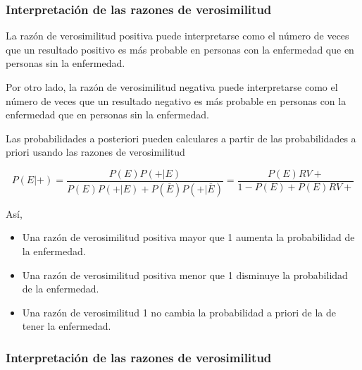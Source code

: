 	
\begin{frame}
\frametitle{Interpretación de las razones de verosimilitud}
La razón de verosimilitud positiva puede interpretarse como el número de veces que un resultado positivo es más probable en personas con la enfermedad que en personas sin la enfermedad.
	
Por otro lado, la razón de verosimilitud negativa puede interpretarse como el número de veces que un resultado negativo es más probable en personas con la enfermedad que en personas sin la enfermedad.
	
Las probabilidades a posteriori pueden calculares a partir de las probabilidades a priori usando las razones de verosimilitud
	
\[
	P(E|+) = \frac{P(E)P(+|E)}{P(E)P(+|E)+P(\overline{E})P(+|\overline{E})} = \frac{P(E)RV+}{1-P(E)+P(E)RV+}
\]
	
Así,
\begin{itemize}
	\item Una razón de verosimilitud positiva mayor que 1 aumenta la probabilidad de la enfermedad.
	\item Una razón de verosimilitud positiva menor que 1 disminuye la probabilidad de la enfermedad.
	\item Una razón de verosimilitud 1 no cambia la probabilidad a priori de la de tener la enfermedad.
\end{itemize}
\end{frame}
	
	
\begin{frame}
\frametitle{Interpretación de las razones de verosimilitud}
\begin{center}
\end{center}
\end{frame}
